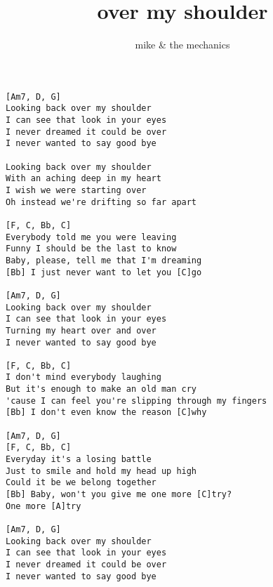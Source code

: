 \author{mike \& the mechanics}
\title{over my shoulder}
\maketitle
\begin{verbatim}
[Am7, D, G]
Looking back over my shoulder
I can see that look in your eyes
I never dreamed it could be over
I never wanted to say good bye

Looking back over my shoulder
With an aching deep in my heart
I wish we were starting over
Oh instead we're drifting so far apart

[F, C, Bb, C]
Everybody told me you were leaving
Funny I should be the last to know
Baby, please, tell me that I'm dreaming
[Bb] I just never want to let you [C]go

[Am7, D, G]
Looking back over my shoulder
I can see that look in your eyes
Turning my heart over and over
I never wanted to say good bye

[F, C, Bb, C]
I don't mind everybody laughing
But it's enough to make an old man cry
'cause I can feel you're slipping through my fingers
[Bb] I don't even know the reason [C]why

[Am7, D, G]
[F, C, Bb, C]
Everyday it's a losing battle
Just to smile and hold my head up high
Could it be we belong together
[Bb] Baby, won't you give me one more [C]try?
One more [A]try

[Am7, D, G]
Looking back over my shoulder
I can see that look in your eyes
I never dreamed it could be over
I never wanted to say good bye
\end{verbatim}
